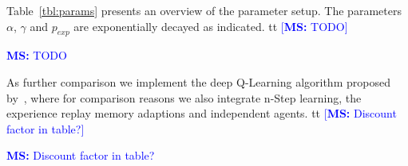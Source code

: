 \documentclass[envcountsame]{llncs}
\newcommand\MS[2][r]{\ifx t#1 \textcolor{blue}{[\textbf{MS:} #2]}
  \else \begin{center}\textcolor{blue}{\textbf{MS:} #2} \end{center} \fi}
\begin{document}
%
Table~\ref{tbl:params} presents an overview of the parameter setup. The parameters \(\alpha\),
\(\gamma\) and \(p_{exp}\) are exponentially decayed as indicated.%
\MS[t]{TODO} As further comparison we implement the deep Q-Learning algorithm proposed
by~\cite{mnih2015human}, where for comparison reasons we also integrate n-Step learning, the
experience replay memory adaptions and independent agents. \MS[t]{Discount factor in table?}

\end{document}
